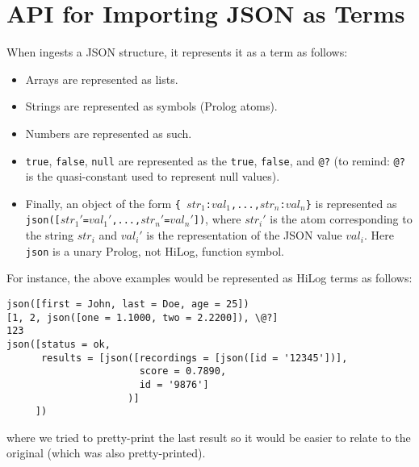 \section{API for Importing JSON  as Terms}

When \ERGO ingests a JSON structure, it represents it as a term as follows:
\begin{itemize}
\item  Arrays are represented as lists.
\item  Strings are represented as \ERGO symbols (Prolog atoms).
\item  Numbers are represented as such.
\item \texttt{true}, \texttt{false}, \texttt{null} are represented as the
  \texttt{\bs{}true}, \texttt{\bs{}false}, and \texttt{\bs{}@?}  (to
  remind: \texttt{\bs{}@?} is the \FLSYSTEM quasi-constant used to
  represent null values).
\item Finally, an object of the form \texttt{\{
    $str_1$:$val_1$,...,$str_n$:$val_n$\}} is represented as
  \texttt{json([$str_1'$=$val_1'$,...,$str_n'$=$val_n'$])}, where
  $str_i'$ is the atom corresponding to the string $str_i$ and $val_i'$ is
  the \ERGO representation of the JSON value $val_i$.
  Here \texttt{json} is a unary Prolog, not HiLog, function
  symbol.
\end{itemize}
For instance, the above examples would be represented as HiLog 
\ERGO terms as follows:
\begin{verbatim}
json([first = John, last = Doe, age = 25])
[1, 2, json([one = 1.1000, two = 2.2200]), \@?]
123
json([status = ok,
      results = [json([recordings = [json([id = '12345'])],
                       score = 0.7890,
                       id = '9876']
                     )]
     ])
\end{verbatim}
where we tried to pretty-print the last result so it would be easier to
relate to the original (which was also pretty-printed).

